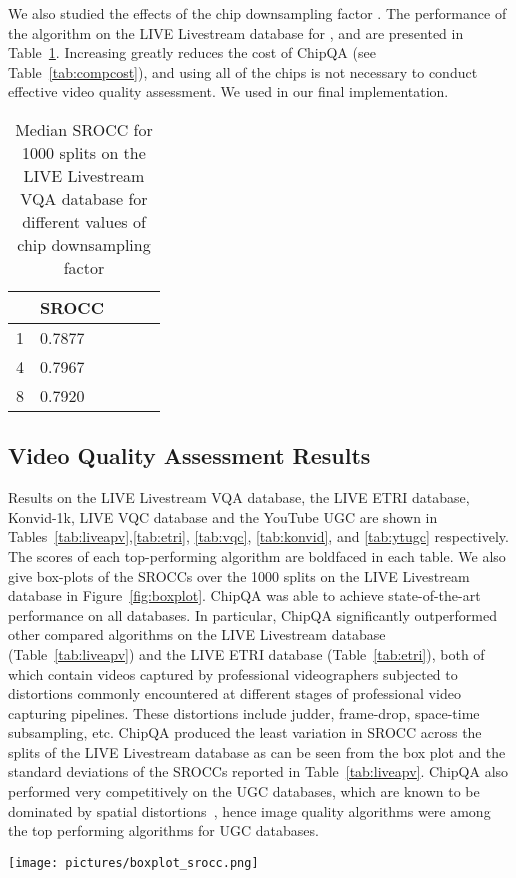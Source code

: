 \documentclass[journal]{IEEEtran}
\begin{document}
We also studied the effects of the chip downsampling factor . The performance of the algorithm on the LIVE Livestream database for ,  and  are presented in Table~\ref{tab:downsample}. Increasing  greatly reduces the cost of ChipQA (see Table~\ref{tab:compcost}), and using all of the chips is not necessary to conduct effective video quality assessment. We used  in our final implementation.

\begin{table}
\caption{Median SROCC for 1000 splits on the LIVE Livestream VQA database for different values of chip downsampling factor } 
\begin{center} 
\begin{tabular}{|l|l|l|l|l|}
\hline
  & SROCC \\
\hline
1 &  0.7877\\
\hline
4 & 0.7967 \\
\hline
8 &  0.7920 \\
\hline
\end{tabular}
\label{tab:downsample}
\end{center}
\vspace{-5mm}
\end{table}



\subsection{Video Quality Assessment Results}\label{results}

Results on the LIVE Livestream VQA database, the LIVE ETRI database, Konvid-1k, LIVE VQC database and the  YouTube UGC  are shown in Tables~\ref{tab:liveapv},\ref{tab:etri}, \ref{tab:vqc}, \ref{tab:konvid}, and \ref{tab:ytugc} respectively. The scores of each  top-performing algorithm are boldfaced in each table. We also give box-plots of the SROCCs over the 1000 splits on the LIVE Livestream database in Figure~\ref{fig:boxplot}. ChipQA was able to achieve state-of-the-art performance on all databases. In particular, ChipQA significantly outperformed other compared algorithms on the LIVE Livestream database (Table~\ref{tab:liveapv}) and the LIVE ETRI database (Table~\ref{tab:etri}), both of which contain videos captured by professional videographers subjected to distortions commonly encountered at different stages of professional video capturing pipelines. These distortions include judder, frame-drop, space-time subsampling, etc. ChipQA produced the least variation in SROCC across the splits of the LIVE Livestream database as can be seen from the box plot and the standard deviations of the SROCCs reported in Table~\ref{tab:liveapv}.  ChipQA also performed very competitively on the UGC databases, which are known to be dominated by spatial distortions~\cite{pooling,videval}, hence image quality algorithms were among the top performing algorithms for UGC databases. 
\begin{figure*}[!h] 
  \texttt{[image: pictures/boxplot\_srocc.png]}
  \caption{Box-plot of distribution of SROCCs for different algorithms for 1000 splits of the LIVE Livestream database.}\label{fig:boxplot}
\end{figure*}
\end{document}
